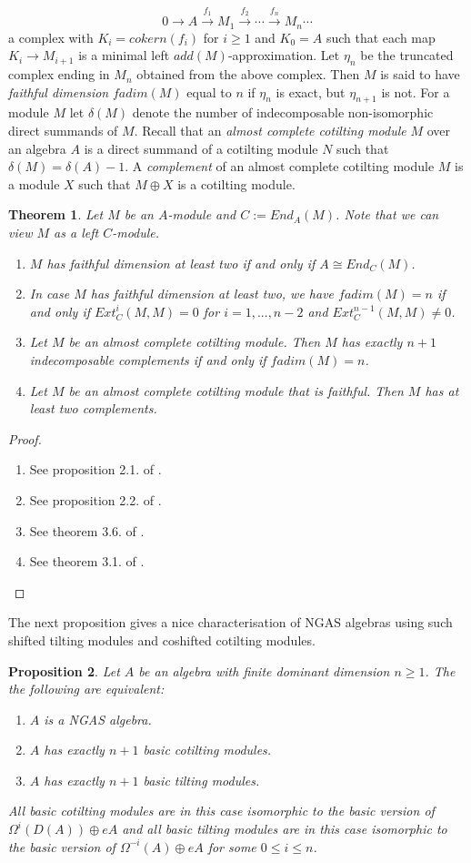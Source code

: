 \documentclass[a4paper]{amsart}
\newtheorem{theorem}{Theorem}[section]
\newtheorem{proposition}[theorem]{Proposition}
\theoremstyle{definition}
\theoremstyle{remark}
\numberwithin{equation}{theorem}
\begin{document}
$$0 \rightarrow A \xrightarrow{f_1} M_1 \xrightarrow{f_2} \cdots \xrightarrow{f_n} M_n \cdots$$
a complex with $K_i = cokern(f_i)$ for $i \geq 1$ and $K_0=A$ such that each map $K_i \rightarrow M_{i+1}$ is a minimal left $add(M)$-approximation. Let $\eta_n$ be the truncated complex ending in $M_n$ obtained from the above complex.
Then $M$ is said to have \emph{faithful dimension} $fadim(M)$ equal to $n$ if $\eta_n$ is exact, but $\eta_{n+1}$ is not.
For a module $M$ let $\delta(M)$ denote the number of indecomposable non-isomorphic direct summands of $M$.
Recall that an \emph{almost complete cotilting module} $M$ over an algebra $A$ is a direct summand of a cotilting module $N$ such that $\delta(M)=\delta(A)-1$. A \emph{complement} of an almost complete cotilting module $M$ is a module $X$ such that $M \oplus X$ is a cotilting module.
\begin{theorem} \label{BStheorem}
Let $M$ be an $A$-module and $C:=End_A(M)$. Note that we can view $M$ as a left $C$-module.
\begin{enumerate}
\item $M$ has faithful dimension at least two if and only if $A \cong End_C(M)$.
\item In case $M$ has faithful dimension at least two, we have $fadim(M)=n$ if and only if $Ext_C^i(M,M)=0$ for $i=1,...,n-2$ and $Ext_C^{n-1}(M,M) \neq 0$.
\item Let $M$ be an almost complete cotilting module. Then $M$ has exactly $n+1$ indecomposable complements if and only if $fadim(M)=n$.
\item Let $M$ be an almost complete cotilting module that is faithful. Then $M$ has at least two complements.
\end{enumerate}
\end{theorem}
\begin{proof}
\begin{enumerate}
\item See proposition 2.1. of \cite{BS}.
\item See proposition 2.2. of \cite{BS}.
\item See theorem 3.6. of \cite{BS}.
\item See theorem 3.1. of \cite{BS}.
\end{enumerate}
\end{proof}
The next proposition gives a nice characterisation of NGAS algebras using such shifted tilting modules and coshifted cotilting modules. 
\begin{proposition} \label{propocotilting}
Let $A$ be an algebra with finite dominant dimension $n \geq 1$.
The the following are equivalent:
\begin{enumerate}
\item $A$ is a NGAS algebra.
\item $A$ has exactly $n+1$ basic cotilting modules.
\item $A$ has exactly $n+1$ basic tilting modules.
\end{enumerate}
All basic cotilting modules are in this case isomorphic to the basic version of $\Omega^{i}(D(A)) \oplus eA$ and all basic tilting modules are in this case isomorphic to the basic version of $\Omega^{-i}(A) \oplus eA$ for some $0 \leq i \leq n$.
\end{proposition}
\end{document}
